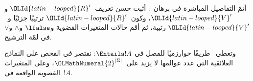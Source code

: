 \documentclass[../../../include/open-logic-section]{subfiles}
\begin{document}
\begin{prob}
أتمّ التفاصيل المباشرة في برهان~:
أثبت حسن تعريف~$\OLId{latin-looped}{R}'$ و$\OLId{latin-looped}{V}'$، وكون~$\OLId{latin-looped}{R}'$ ترتيبًا جزئيًا و~$\OLId{latin-looped}{V}'$
رتيبة، ثم أقم حالات المتغيرات القضوية و$\lfalse$ و$\land$ و$\lor$ في
لمّة الترشيح.
\end{prob}

وتعطي~ طريقًا خوارزميًا للفصل في
$\Entails !A$: نقتصر في الفحص على النماذج العلائقية التي عدد عوالمها
لا يزيد على~$\OLMathNumeral{2}^{|\Sigma|}$، وعلى المتغيرات القضوية الواقعة
في~$!A$.
\end{document}

